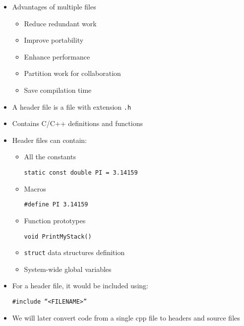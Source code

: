\begin{itemize}

  \item Advantages of multiple files

    \begin{itemize}

      \item Reduce redundant work

      \item Improve portability

      \item Enhance performance

      \item Partition work for collaboration

      \item Save compilation time

    \end{itemize}

  \item A header file is a file with extension \texttt{.h}

  \item Contains C/C++ definitions and functions

  \item Header files can contain:

    \begin{itemize}

      \item All the constants

        \begin{center}
          \texttt{static const double PI = 3.14159}
        \end{center}

      \item Macros

        \begin{center}
          \texttt{\#define PI 3.14159}
        \end{center}

      \item Function prototypes

        \begin{center}
          \texttt{void PrintMyStack()}
        \end{center}

      \item \texttt{struct} data structures definition

      \item System-wide global variables

    \end{itemize}

  \item For a header file, it would be included using:

    \begin{center}
      \texttt{\#include ``<FILENAME>''}
    \end{center}

  \item We will later convert code from a single cpp file to headers and source files

\end{itemize}



